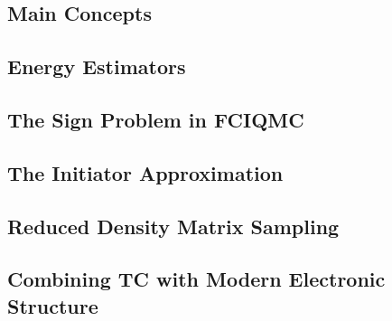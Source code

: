 \subsection{Main Concepts}

\subsection{Energy Estimators}

\subsection{The Sign Problem in FCIQMC}

\subsection{The Initiator Approximation}

\subsection{Reduced Density Matrix Sampling}

\subsection{Combining TC with Modern Electronic Structure}
